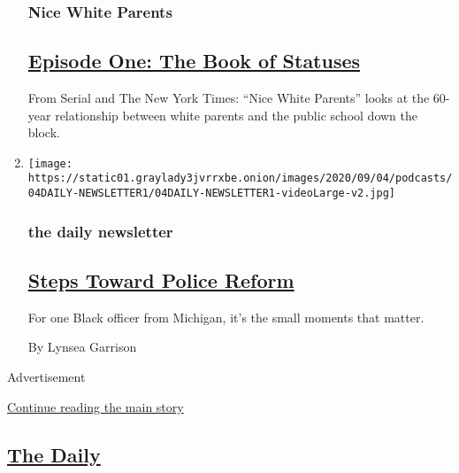 \begin{enumerate}
  \hypertarget{nice-white-parents}{%
  \subsubsection{Nice White Parents}\label{nice-white-parents}}

  \hypertarget{episode-one-the-book-of-statuses}{%
  \subsection{\texorpdfstring{\href{/2020/07/30/podcasts/nice-white-parents-serial.html}{Episode
  One: The Book of
  Statuses}}{Episode One: The Book of Statuses}}\label{episode-one-the-book-of-statuses}}

  From Serial and The New York Times: ``Nice White Parents'' looks at
  the 60-year relationship between white parents and the public school
  down the block.
\item
  \texttt{[image: https://static01.graylady3jvrrxbe.onion/images/2020/09/04/podcasts/04DAILY-NEWSLETTER1/04DAILY-NEWSLETTER1-videoLarge-v2.jpg]}

  \hypertarget{the-daily-newsletter}{%
  \subsubsection{the daily newsletter}\label{the-daily-newsletter}}

  \hypertarget{steps-toward-police-reform}{%
  \subsection{\texorpdfstring{\href{/2020/09/04/podcasts/daily-newsletter-police-reform-belarus.html}{Steps
  Toward Police
  Reform}}{Steps Toward Police Reform}}\label{steps-toward-police-reform}}

  For one Black officer from Michigan, it's the small moments that
  matter.

  By Lynsea Garrison
\end{enumerate}

Advertisement

\protect\hyperlink{after-mid1}{Continue reading the main story}

\hypertarget{the-daily-1}{%
\subsection{\texorpdfstring{\href{/column/the-daily}{The
Daily}}{The Daily}}\label{the-daily-1}}


